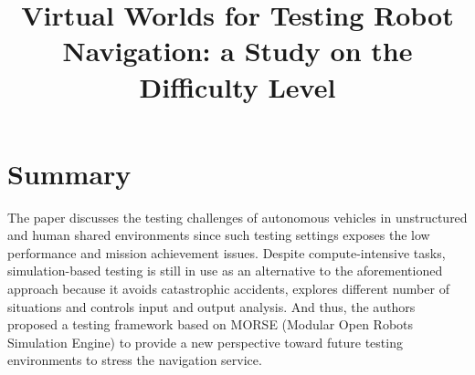 \documentclass[10pt,a4paper]{report}
\title{Virtual Worlds for Testing Robot Navigation: a Study on the Difficulty Level}
\begin{document}
\begin{center}
\textbf{\thetitle}
\end{center}


\section{Summary}
The paper discusses the testing challenges of autonomous vehicles in unstructured and human shared environments since such testing settings exposes the low performance and mission achievement issues. 
%
Despite compute-intensive tasks, simulation-based testing is still in use as an alternative to the aforementioned approach because it avoids catastrophic accidents, explores different number of situations and controls input and output analysis.
%
And thus, the authors proposed a testing framework based on MORSE (Modular Open Robots Simulation Engine) to provide a new perspective toward future testing environments to stress the navigation service.
%
\end{document}
